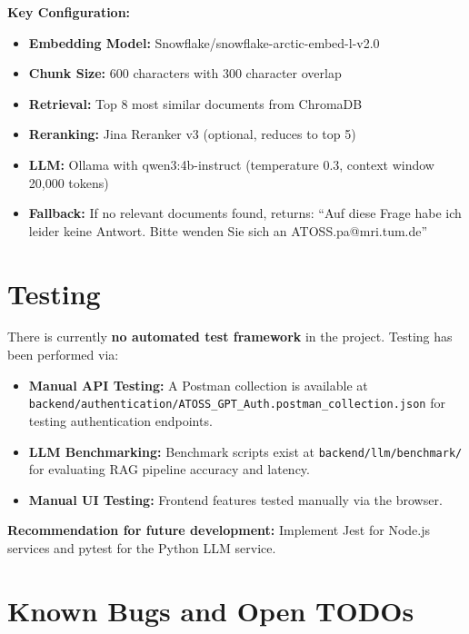 \documentclass[a4paper,12pt]{report}
\begin{document}
\textbf{Key Configuration:}
\begin{itemize}
    \item \textbf{Embedding Model:} Snowflake/snowflake-arctic-embed-l-v2.0
    \item \textbf{Chunk Size:} 600 characters with 300 character overlap
    \item \textbf{Retrieval:} Top 8 most similar documents from ChromaDB
    \item \textbf{Reranking:} Jina Reranker v3 (optional, reduces to top 5)
    \item \textbf{LLM:} Ollama with qwen3:4b-instruct (temperature 0.3, context window 20,000 tokens)
    \item \textbf{Fallback:} If no relevant documents found, returns: ``Auf diese Frage habe ich leider keine Antwort. Bitte wenden Sie sich an ATOSS.pa@mri.tum.de''
\end{itemize}

\section{Testing}

There is currently \textbf{no automated test framework} in the project. Testing has been performed via:

\begin{itemize}
    \item \textbf{Manual API Testing:} A Postman collection is available at \texttt{backend/authentication/ATOSS\_GPT\_Auth.postman\_collection.json} for testing authentication endpoints.
    \item \textbf{LLM Benchmarking:} Benchmark scripts exist at \texttt{backend/llm/benchmark/} for evaluating RAG pipeline accuracy and latency.
    \item \textbf{Manual UI Testing:} Frontend features tested manually via the browser.
\end{itemize}

\textbf{Recommendation for future development:} Implement Jest for Node.js services and pytest for the Python LLM service.

\section{Known Bugs and Open TODOs}
\end{document}
